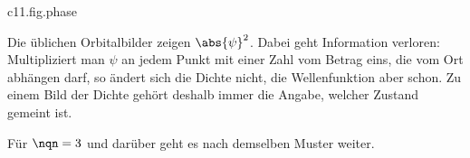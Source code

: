 \begin{tpcfigure}{c11.fig.phase}
  \caption{Vorzeichen und Phase der 2p-Wellenfunktionen für $\Znuc = 1$; die Grauwerte
    zeigen wieder $\abs{\psi}^2$. Links $\psinlm{2}{1}{0}$ in der Ebene $y = 0$: Die
    Funktion ist reell, oben positiv, unten negativ. Rechts $\psinlm{2}{1}{1}$ in der
    Ebene $z = 0$: Der Betrag hängt nur vom Abstand zur Mitte ab, die Phase
    $\arg\psinlm{2}{1}{1} = \phi + \pi$ nur vom Winkel $\phi$; an den vier Strahlen
    steht ihr Wert, und der Pfeil zeigt, in welcher Richtung sie wächst. Für
    $\psinlm{2}{1}{-1}$ läuft die Phase andersherum.}
\end{tpcfigure}

\begin{remark}
  Die üblichen Orbitalbilder zeigen $\abs{\psi}^2$. Dabei geht Information verloren:
  Multipliziert man $\psi$ an jedem Punkt mit einer Zahl vom Betrag eins, die vom Ort
  abhängen darf, so ändert sich die Dichte nicht, die Wellenfunktion aber schon. Zu
  einem Bild der Dichte gehört deshalb immer die Angabe, welcher Zustand gemeint ist.
\end{remark}

Für $\nqn = 3$ und darüber geht es nach demselben Muster weiter.

